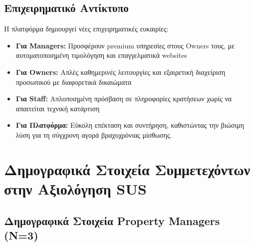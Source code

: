 \documentclass[
	12pt, %
	oneside, %
	greek,
	onehalfspacing, %
	liststotoc, %
	toctotoc, %
	parskip, %
	headsepline, %
]{MastersDoctoralThesis} %
\begin{document}
\section{Επιχειρηματικό Αντίκτυπο}
\label{sec:business-impact}

Η πλατφόρμα δημιουργεί νέες επιχειρηματικές ευκαιρίες:

\begin{itemize}
    \item \textbf{Για Managers:} Προσφέρουν premium υπηρεσίες στους Owners τους, με αυτοματοποιημένη τιμολόγηση και επαγγελματικά websites
    \item \textbf{Για Owners:} Απλές καθημερινές λειτουργίες και εξαιρετική διαχείριση προσωπικού με διαφορετικά δικαιώματα
    \item \textbf{Για Staff:} Απλοποιημένη πρόσβαση σε πληροφορίες κρατήσεων χωρίς να απαιτείται τεχνική κατάρτιση
    \item \textbf{Για Πλατφόρμα:} Εύκολη επέκταση και συντήρηση, καθιστώντας την βιώσιμη λύση για τη σύγχρονη αγορά βραχυχρόνιας μίσθωσης.
\end{itemize}


\cleardoublepage
{}
{}
\printbibliography[title={Βιβλιογραφία}]


\appendix


\chapter{Δημογραφικά Στοιχεία Συμμετεχόντων στην Αξιολόγηση SUS}
\label{appendix:demographics}

\section{Δημογραφικά Στοιχεία Property Managers (N=3)}
\label{sec:demographics-managers}
\end{document}
